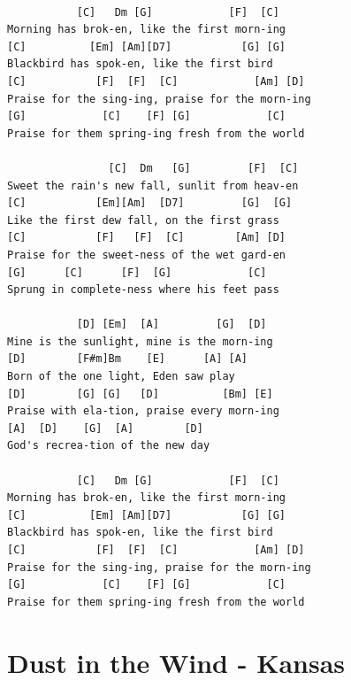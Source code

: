 \documentclass[
]{book}
\let\stdsection\section
\renewcommand\section{\clearpage\stdsection}
\begin{document}
\begin{verbatim}

           [C]   Dm [G]            [F]  [C]
Morning has brok-en, like the first morn-ing
[C]          [Em] [Am][D7]           [G] [G]
Blackbird has spok-en, like the first bird
[C]           [F]  [F]  [C]            [Am] [D]
Praise for the sing-ing, praise for the morn-ing
[G]            [C]    [F] [G]            [C]
Praise for them spring-ing fresh from the world

                [C]  Dm   [G]         [F]  [C]
Sweet the rain's new fall, sunlit from heav-en
[C]           [Em][Am]  [D7]         [G]  [G]
Like the first dew fall, on the first grass
[C]           [F]   [F]  [C]        [Am] [D]
Praise for the sweet-ness of the wet gard-en
[G]      [C]      [F]  [G]            [C]
Sprung in complete-ness where his feet pass

           [D] [Em]  [A]         [G]  [D]
Mine is the sunlight, mine is the morn-ing
[D]        [F#m]Bm    [E]      [A] [A]
Born of the one light, Eden saw play
[D]        [G] [G]   [D]          [Bm] [E]
Praise with ela-tion, praise every morn-ing
[A]  [D]    [G]  [A]        [D]
God's recrea-tion of the new day

           [C]   Dm [G]            [F]  [C]
Morning has brok-en, like the first morn-ing
[C]          [Em] [Am][D7]           [G] [G]
Blackbird has spok-en, like the first bird
[C]           [F]  [F]  [C]            [Am] [D]
Praise for the sing-ing, praise for the morn-ing
[G]            [C]    [F] [G]            [C]
Praise for them spring-ing fresh from the world
\end{verbatim}

\hypertarget{dust-in-the-wind---kansas}{%
\section{Dust in the Wind - Kansas}\label{dust-in-the-wind---kansas}}
\end{document}
